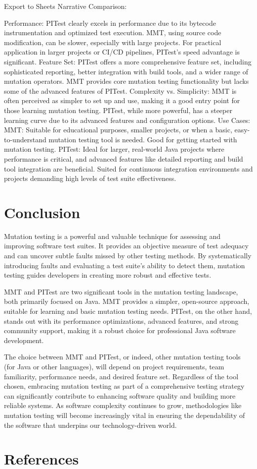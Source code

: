 \documentclass[sigplan, nonacm]{acmart}
\begin{document}
Export to Sheets
Narrative Comparison:

Performance: PITest clearly excels in performance due to its bytecode instrumentation and optimized test execution. MMT, using source code modification, can be slower, especially with large projects. For practical application in larger projects or CI/CD pipelines, PITest's speed advantage is significant.
Feature Set: PITest offers a more comprehensive feature set, including sophisticated reporting, better integration with build tools, and a wider range of mutation operators. MMT provides core mutation testing functionality but lacks some of the advanced features of PITest.
Complexity vs. Simplicity: MMT is often perceived as simpler to set up and use, making it a good entry point for those learning mutation testing. PITest, while more powerful, has a steeper learning curve due to its advanced features and configuration options.
Use Cases:
MMT: Suitable for educational purposes, smaller projects, or when a basic, easy-to-understand mutation testing tool is needed. Good for getting started with mutation testing.
PITest: Ideal for larger, real-world Java projects where performance is critical, and advanced features like detailed reporting and build tool integration are beneficial. Suited for continuous integration environments and projects demanding high levels of test suite effectiveness.
\section{Conclusion}

Mutation testing is a powerful and valuable technique for assessing and improving software test suites. It provides an objective measure of test adequacy and can uncover subtle faults missed by other testing methods. By systematically introducing faults and evaluating a test suite's ability to detect them, mutation testing guides developers in creating more robust and effective tests.

MMT and PITest are two significant tools in the mutation testing landscape, both primarily focused on Java. MMT provides a simpler, open-source approach, suitable for learning and basic mutation testing needs. PITest, on the other hand, stands out with its performance optimizations, advanced features, and strong community support, making it a robust choice for professional Java software development.

The choice between MMT and PITest, or indeed, other mutation testing tools (for Java or other languages), will depend on project requirements, team familiarity, performance needs, and desired feature set. Regardless of the tool chosen, embracing mutation testing as part of a comprehensive testing strategy can significantly contribute to enhancing software quality and building more reliable systems. As software complexity continues to grow, methodologies like mutation testing will become increasingly vital in ensuring the dependability of the software that underpins our technology-driven world.

\section{References}
\end{document}
